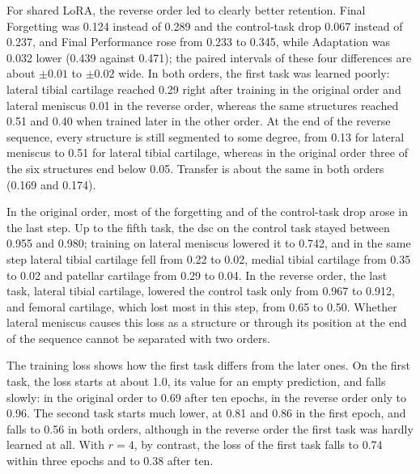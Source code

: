 For shared LoRA, the reverse order led to clearly better retention.
Final Forgetting was 0.124 instead of 0.289 and the control-task drop 0.067 instead of 0.237, and Final Performance rose from 0.233 to 0.345, while Adaptation was 0.032 lower (0.439 against 0.471); the paired intervals of these four differences are about $\pm 0.01$ to $\pm 0.02$ wide.
In both orders, the first task was learned poorly: lateral tibial cartilage reached 0.29 right after training in the original order and lateral meniscus 0.01 in the reverse order, whereas the same structures reached 0.51 and 0.40 when trained later in the other order.
At the end of the reverse sequence, every structure is still segmented to some degree, from 0.13 for lateral meniscus to 0.51 for lateral tibial cartilage, whereas in the original order three of the six structures end below 0.05.
Transfer is about the same in both orders (0.169 and 0.174).

In the original order, most of the forgetting and of the control-task drop arose in the last step.
Up to the fifth task, the \gls{dsc} on the control task stayed between 0.955 and 0.980; training on lateral meniscus lowered it to 0.742, and in the same step lateral tibial cartilage fell from 0.22 to 0.02, medial tibial cartilage from 0.35 to 0.02 and patellar cartilage from 0.29 to 0.04.
In the reverse order, the last task, lateral tibial cartilage, lowered the control task only from 0.967 to 0.912, and femoral cartilage, which lost most in this step, from 0.65 to 0.50.
Whether lateral meniscus causes this loss as a structure or through its position at the end of the sequence cannot be separated with two orders.

The training loss shows how the first task differs from the later ones.
On the first task, the loss starts at about 1.0, its value for an empty prediction, and falls slowly: in the original order to 0.69 after ten epochs, in the reverse order only to 0.96.
The second task starts much lower, at 0.81 and 0.86 in the first epoch, and falls to 0.56 in both orders, although in the reverse order the first task was hardly learned at all.
With $r = 4$, by contrast, the loss of the first task falls to 0.74 within three epochs and to 0.38 after ten.

